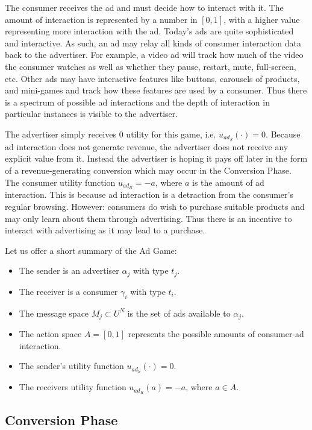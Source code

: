 \documentclass{article}
\begin{document}
The consumer receives the ad and must decide how to interact with it. The amount of interaction is represented by a number in $[0,1]$, with a higher value representing more interaction with the ad. Today's ads are quite sophisticated and interactive. As such, an ad may relay all kinds of consumer interaction data back to the advertiser. For example, a video ad will track how much of the video the consumer watches as well as whether they pause, restart, mute, full-screen, etc. Other ads may have interactive features like buttons, carousels of products, and mini-games and track how these features are used by a consumer. Thus there is a spectrum of possible ad interactions and the depth of interaction in particular instances is visible to the advertiser.

The advertiser simply receives 0 utility for this game, i.e. $u_{ad_S}(\cdot) = 0$. Because ad interaction does not generate revenue, the advertiser does not receive any explicit value from it. Instead the advertiser is hoping it pays off later in the form of a revenue-generating conversion which may occur in the Conversion Phase. The consumer utility function $u_{ad_R} = -a$, where $a$ is the amount of ad interaction. This is because ad interaction is a detraction from the consumer's regular browsing. However: consumers do wish to purchase suitable products and may only learn about them through advertising. Thus there is an incentive to interact with advertising as it may lead to a purchase.

Let us offer a short summary of the Ad Game:

\begin{itemize}
	\item The sender is an advertiser $\alpha_j$ with type $t_j$.
	\item The receiver is a consumer $\gamma_i$ with type $t_i$.
	\item The message space $M_j \subset U^N$ is the set of ads available to $\alpha_j$.
	\item The action space $A = [0,1]$ represents the possible amounts of consumer-ad interaction.
	\item The sender's utility function $u_{ad_S}(\cdot) = 0$.
	\item The receivers utility function $u_{ad_R}(a) = -a$, where $a \in A$.
\end{itemize}

\subsection{Conversion Phase}
\end{document}
